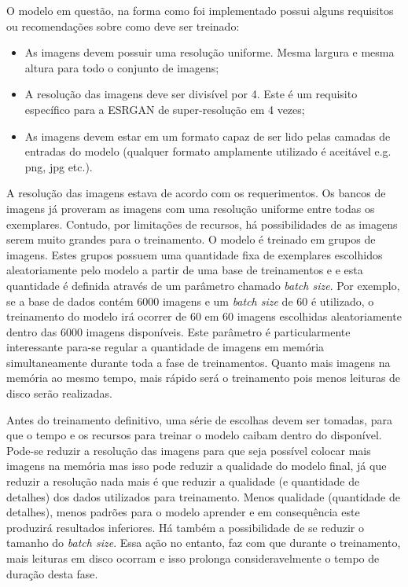 O modelo em questão, na forma como foi implementado possui alguns requisitos ou recomendações sobre como deve ser treinado:

\begin{itemize}
    \item As imagens devem possuir uma resolução uniforme. Mesma largura e mesma altura para todo o conjunto de imagens;

    \item A resolução das imagens deve ser divisível por 4. Este é um requisito específico para a ESRGAN de super-resolução em 4 vezes;

    \item As imagens devem estar em um formato capaz de ser lido pelas camadas de entradas do modelo (qualquer formato amplamente utilizado é aceitável e.g. png, jpg etc.).
\end{itemize}

A resolução das imagens estava de acordo com os requerimentos. Os bancos de imagens já proveram as imagens com uma resolução uniforme entre todas os exemplares. Contudo, por limitações de recursos, há possibilidades de as imagens serem muito grandes para o treinamento. O modelo é treinado em grupos de imagens. Estes grupos possuem uma quantidade fixa de exemplares escolhidos aleatoriamente pelo modelo a partir de uma base de treinamentos e e esta quantidade é definida através de um parâmetro chamado \textit{batch size}. Por exemplo, se a base de dados contém 6000 imagens e um \textit{batch size} de 60 é utilizado, o treinamento do modelo irá ocorrer de 60 em 60 imagens escolhidas aleatoriamente dentro das 6000 imagens disponíveis. Este parâmetro é particularmente interessante para-se regular a quantidade de imagens em memória simultaneamente durante toda a fase de treinamentos. Quanto mais imagens na memória ao mesmo tempo, mais rápido será o treinamento pois menos leituras de disco serão realizadas.

Antes do treinamento definitivo, uma série de escolhas devem ser tomadas, para que o tempo e os recursos para treinar o modelo caibam dentro do disponível. Pode-se reduzir a resolução das imagens para que seja possível colocar mais imagens na memória mas isso pode reduzir a qualidade do modelo final, já que reduzir a resolução nada mais é que reduzir a qualidade (e quantidade de detalhes) dos dados utilizados para treinamento. Menos qualidade (quantidade de detalhes), menos padrões para o modelo aprender e em consequência este produzirá resultados inferiores. Há também a possibilidade de se  reduzir o tamanho do \textit{batch size}. Essa ação no entanto, faz com que durante o treinamento, mais leituras em disco ocorram e isso prolonga consideravelmente o tempo de duração desta fase.

